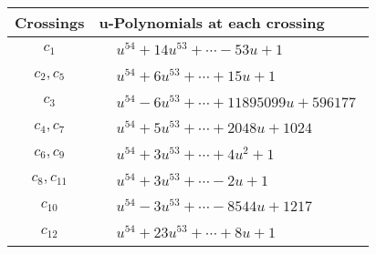 \documentclass[1p]{elsarticle_modified}
\theoremstyle{definition}
\begin{document}
\begin{tabular}{m{50pt}|m{274pt}}
Crossings & \hspace{64pt}u-Polynomials at each crossing \\
\hline $$\begin{aligned}c_{1}\end{aligned}$$&$\begin{aligned}
&u^{54}+14 u^{53}+\cdots-53 u+1
\end{aligned}$\\
\hline $$\begin{aligned}c_{2},c_{5}\end{aligned}$$&$\begin{aligned}
&u^{54}+6 u^{53}+\cdots+15 u+1
\end{aligned}$\\
\hline $$\begin{aligned}c_{3}\end{aligned}$$&$\begin{aligned}
&u^{54}-6 u^{53}+\cdots+11895099 u+596177
\end{aligned}$\\
\hline $$\begin{aligned}c_{4},c_{7}\end{aligned}$$&$\begin{aligned}
&u^{54}+5 u^{53}+\cdots+2048 u+1024
\end{aligned}$\\
\hline $$\begin{aligned}c_{6},c_{9}\end{aligned}$$&$\begin{aligned}
&u^{54}+3 u^{53}+\cdots+4 u^2+1
\end{aligned}$\\
\hline $$\begin{aligned}c_{8},c_{11}\end{aligned}$$&$\begin{aligned}
&u^{54}+3 u^{53}+\cdots-2 u+1
\end{aligned}$\\
\hline $$\begin{aligned}c_{10}\end{aligned}$$&$\begin{aligned}
&u^{54}-3 u^{53}+\cdots-8544 u+1217
\end{aligned}$\\
\hline $$\begin{aligned}c_{12}\end{aligned}$$&$\begin{aligned}
&u^{54}+23 u^{53}+\cdots+8 u+1
\end{aligned}$\\
\hline
\end{tabular}\\~\\
\end{document}
